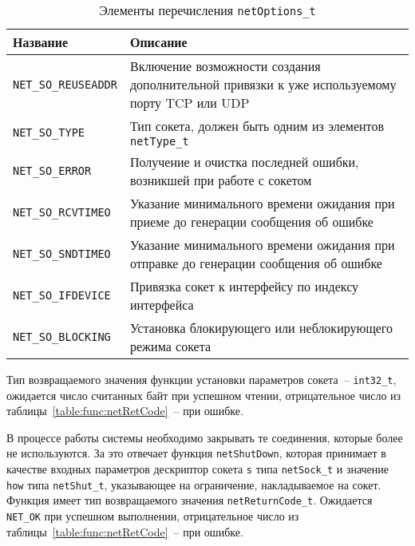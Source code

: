 \begin{table}[ht]
    \caption{Элементы перечисления \lstinline{netOptions_t}}
    \label{table:func:netOptions}
    \begin{tabular}{| >{\raggedright}m{}
                    | >{\raggedright\arraybackslash}m{}|}
        \hline
        \centering Название & \centering\arraybackslash Описание \\

        \hline
        \lstinline[]$NET_SO_REUSEADDR$ &
        Включение возможности создания дополнительной привязки к уже используемому порту TCP или UDP
        \\

        \hline
        \lstinline[]$NET_SO_TYPE$ &
        Тип сокета, должен быть одним из элементов \lstinline[]$netType_t$
        \\

        \hline
        \lstinline[]$NET_SO_ERROR$ &
        Получение и очистка последней ошибки, возникшей при работе с сокетом
        \\

        \hline
        \lstinline[]$NET_SO_RCVTIMEO$ &
        Указание минимального времени ожидания при приеме до генерации сообщения об ошибке
        \\

        \hline
        \lstinline[]$NET_SO_SNDTIMEO$ &
        Указание минимального времени ожидания при отправке до генерации сообщения об ошибке
        \\

        \hline
        \lstinline[]$NET_SO_IFDEVICE$ &
        Привязка сокет к интерфейсу по индексу интерфейса
        \\

        \hline
        \lstinline[]$NET_SO_BLOCKING$ &
        Установка блокирующего или неблокирующего режима сокета
        \\

        \hline
    \end{tabular}
\end{table}

Тип возвращаемого значения функции установки параметров сокета~-- \lstinline{int32_t}, ожидается число считанных байт при успешном чтении, отрицательное число из таблицы~\ref{table:func:netRetCode}~-- при ошибке.

В процессе работы системы необходимо закрывать те соединения, которые более не используются.
За это отвечает функция \lstinline{netShutDown}, которая принимает в качестве входных
параметров дескриптор сокета \lstinline{s} типа \lstinline{netSock_t} и значение \lstinline{how} типа \lstinline{netShut_t}, указывающее на ограничение, накладываемое на
сокет. Функция имеет тип возвращаемого значения \lstinline{netReturnCode_t}. Ожидается \lstinline{NET_OK} при успешном выполнении, отрицательное число из таблицы~\ref{table:func:netRetCode}~-- при ошибке.

